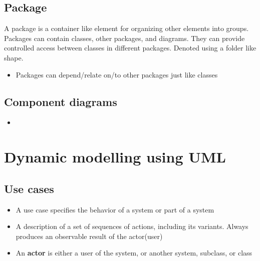 \documentclass[12pt]{book}
\begin{document}
\subsection*{Package}
A package is a container like element for organizing other elements into groups. Packages can contain classes, other packages, and diagrams. They can provide controlled access between classes in different packages. Denoted using a folder like shape.

\begin{itemize}
    \item Packages can depend/relate on/to other packages just like classes
\end{itemize}

\subsection*{Component diagrams}

\begin{itemize}
    \item 
\end{itemize}

\section*{Dynamic modelling using UML}

\subsection*{Use cases}
\begin{itemize}
    \item A use case specifies the behavior of a system or part of a system
    \item A description of a set of sequences of actions, including its variants. Always  produces an observable result of the actor(user)
    \item An \textbf{actor} is either a user of the system, or another system, subclass, or class
\end{itemize}

\end{document}
